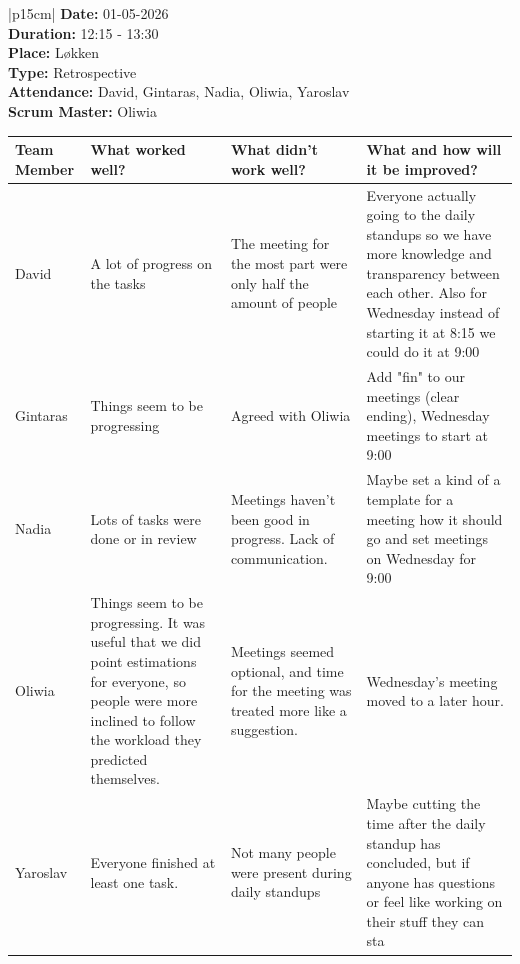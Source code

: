 \begin{table}[H]
    \centering
    \begin{tabular}{|p{15cm}|}   
        \hline
        \textbf{Date:}  01-05-2026 \\
        \textbf{Duration:}  12:15 - 13:30 \\
        \textbf{Place:}  Løkken \\
        \textbf{Type:} Retrospective \\
        \textbf{Attendance:} David, Gintaras, Nadia, Oliwia, Yaroslav \\
        \textbf{Scrum Master:}  Oliwia 
        \begin{table}[H]
            \begin{tabular}{|p{1.75cm}|p{4cm}|p{4cm}|p{4cm}|}
                \hline
                \cellcolor[HTML]{BFBFBF}  \textbf{Team Member} & \cellcolor[HTML]{BFBFBF} \textbf{What worked well?} & \cellcolor[HTML]{BFBFBF}  \textbf{What didn’t work well?} & \cellcolor[HTML]{BFBFBF}  \textbf{What and how will it be improved?}\\
                \hline
                \cellcolor[HTML]{d4d4d4} David & A lot of progress on the tasks & The meeting for the most part were only half the amount of people & Everyone actually going to the daily standups so we have more knowledge and transparency between each other. Also for Wednesday instead of starting it at 8:15 we could do it at 9:00 \\
                \hline
                \cellcolor[HTML]{d4d4d4} Gintaras & Things seem to be progressing & Agreed with Oliwia & Add "fin" to our meetings (clear ending), Wednesday meetings to start at 9:00 \\
                \hline
                \cellcolor[HTML]{d4d4d4} Nadia & Lots of tasks were done or in review & Meetings haven't been good in progress. Lack of communication. & Maybe set a kind of a template for a meeting how it should go and set meetings on Wednesday for 9:00  \\
                \hline
                \cellcolor[HTML]{d4d4d4} Oliwia & Things seem to be progressing. It was useful that we did point estimations for everyone, so people were more inclined to follow the workload they predicted themselves. & Meetings seemed optional, and time for the meeting was treated more like a suggestion. & Wednesday's meeting moved to a later hour. \\
                \hline
                \cellcolor[HTML]{d4d4d4} Yaroslav & Everyone finished at least one task. & Not many people were present during daily standups & Maybe cutting the time after the daily standup has concluded, but if anyone has questions or feel like working on their stuff they can sta \\
                \hline
            \end{tabular}
        \end{table}
        \\
        \hline
    \end{tabular}
\end{table}

